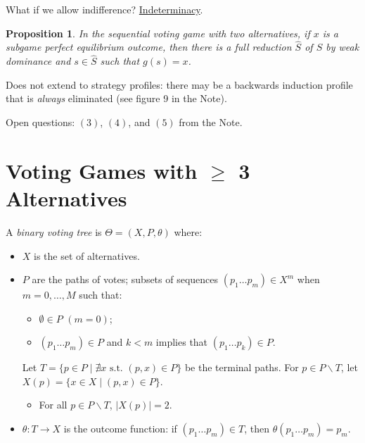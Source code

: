 \documentclass[12pt]{article}
\newtheorem{propo}{Proposition}[section]
\newcommand{\n}{\noindent}
\newcommand{\s}{\vspace{5mm}}
\begin{document}
\s
\n  What if we allow indifference?  \underline{Indeterminacy}.

\s
\n\begin{propo}  In the sequential voting game with two alternatives, if $x$ is a subgame perfect equilibrium outcome, then there is a full reduction $\widehat{S}$ of $S$ by weak dominance and $s\in\widehat{S}$ such that $g(s)=x$.
\end{propo}


\s
\n  Does not extend to strategy profiles: there may be a backwards induction profile that is \textit{always} eliminated (see figure 9 in the Note).

\s
\n Open questions: $(3)$, $(4)$, and $(5)$ from the Note.




\section{Voting Games with $\geq$ 3 Alternatives}
\s
\n A \textit{binary voting tree} is $\Theta=(X,P,\theta)$ where:
\begin{itemize}
\item $X$ is the set of alternatives.
\item $P$ are the paths of votes; subsets of sequences $(p_1\hdots p_m)\in X^m$ when $m=0,\hdots,M$ such that:
\begin{itemize}
\item $\emptyset\in P$ $(m=0)$;
\item $(p_1\hdots p_m)\in P$ and $k<m$ implies that $(p_1\hdots p_k)\in P$.
\end{itemize}
Let $T=\{p\in P\mid \nexists x \mbox{ s.t. }(p,x)\in P\}$ be the terminal paths.  For $p\in P\backslash T$, let $X(p)=\{x\in X\mid (p,x)\in P\}$.
\begin{itemize}
\item For all $p\in P\backslash T$, $\mid X(p)\mid=2$.
\end{itemize}
\item $\theta:T\longrightarrow X$ is the outcome function: if $(p_1\hdots p_m)\in T$, then $\theta(p_1\hdots p_m)=p_m$.
\end{itemize}
\end{document}
